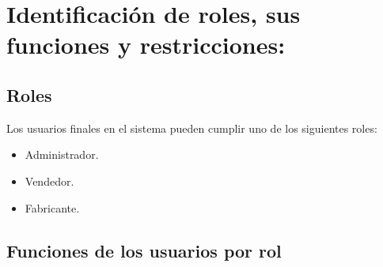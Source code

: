 \section{Identificación de roles, sus funciones y restricciones:}
    \subsection{Roles}
    Los usuarios finales en el sistema pueden cumplir uno de los siguientes roles:
    \begin{itemize}
        \item Administrador.
        \item Vendedor.
        \item Fabricante.
    \end{itemize}
    \subsection{Funciones de los usuarios por rol}
